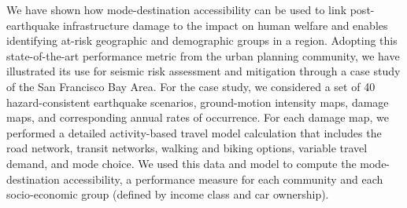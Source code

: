 We have shown how mode-destination accessibility can be used to link post-earthquake infrastructure damage to the impact on human welfare and enables identifying at-risk geographic and demographic groups in a region. 
Adopting this state-of-the-art performance metric from the urban planning community, we have illustrated its use for seismic risk assessment and mitigation through a case study of the San Francisco Bay Area. For the case study, we considered a set of 40 hazard-consistent earthquake scenarios, ground-motion intensity maps, damage maps, and corresponding annual rates of occurrence. For each damage map, we performed a detailed activity-based travel model calculation that includes the road network, transit networks, walking and biking options, variable travel demand, and mode choice. We used this data and model to compute the mode-destination accessibility, a performance measure for each community and each socio-economic group (defined by income class and car ownership). 


%

